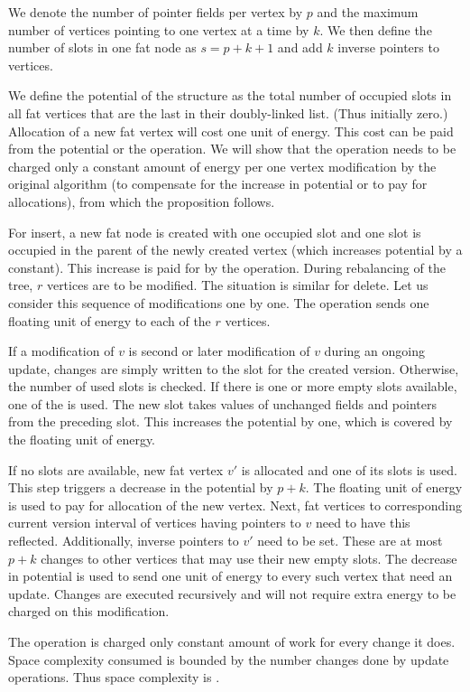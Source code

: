 \begin{myproof}
We denote the number of pointer fields per vertex by $p$ and the maximum number of vertices pointing to one vertex at a time by $k$. 
We then define the number of slots in one fat node as $s = p + k + 1$ and add $k$ inverse pointers to vertices.

We define the potential of the structure as the total number of occupied slots in all fat vertices that are the last in their doubly-linked list. 
(Thus initially zero.) 
Allocation of a new fat vertex will cost one unit of energy. 
This cost can be paid from the potential or the operation. 
We will show that the operation needs to be charged only a constant amount of energy per one vertex modification by the original algorithm (to compensate for the increase in potential or to pay for allocations), from which the proposition follows.

For insert, a new fat node is created with one occupied slot and one slot is occupied in the parent of the newly created vertex (which increases potential by a constant). 
This increase is paid for by the operation. During rebalancing of the tree, $r$ vertices are to be modified. 
The situation is similar for delete.
Let us consider this sequence of modifications one by one. 
The operation sends one floating unit of energy to each of the $r$ vertices.

If a modification of $v$ is second or later modification of $v$ during an ongoing update, changes are simply written to the slot for the created version. 
Otherwise, the number of used slots is checked. 
If there is one or more empty slots available, one of the is used. 
The new slot takes values of unchanged fields and pointers from the preceding slot. 
This increases the potential by one, which is covered by the floating unit of energy.

If no slots are available, new fat vertex $v'$ is allocated and one of its slots is used. 
This step triggers a decrease in the potential by $p+k$. 
The floating unit of energy is used to pay for allocation of the new vertex. 
Next, fat vertices to corresponding current version interval of vertices having pointers to $v$ need to have this reflected. 
Additionally, inverse pointers to $v'$ need to be set. 
These are at most $p+k$ changes to other vertices that may use their new empty slots. 
The decrease in potential is used to send one unit of energy to every such vertex that need an update. 
Changes are executed recursively and will not require extra energy to be charged on this modification.

The operation is charged only constant amount of work for every change it does.
Space complexity consumed is bounded by the number changes done by update operations. Thus space complexity is . 
\end{myproof}

